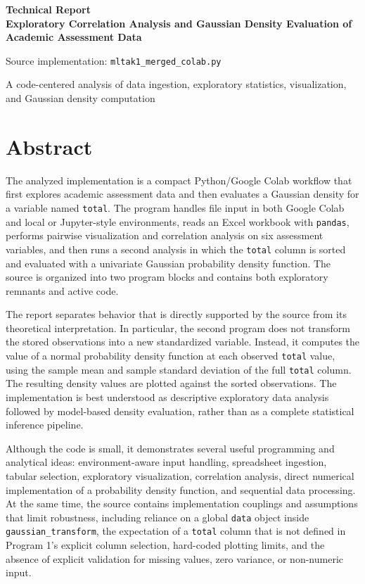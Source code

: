 \documentclass[11pt,a4paper]{article}
\begin{document}
\begin{titlepage}
\centering
\vspace*{2.0cm}
{\LARGE\bfseries Technical Report\\[0.35cm]
Exploratory Correlation Analysis and Gaussian Density Evaluation of Academic Assessment Data\par}
\vspace{1.2cm}
{\large Source implementation: \texttt{mltak1\_merged\_colab.py}\par}
\vfill
{\large A code-centered analysis of data ingestion, exploratory statistics, visualization, and Gaussian density computation\par}
\vspace*{1.5cm}
\end{titlepage}

\tableofcontents
\newpage

\section*{Abstract}
The analyzed implementation is a compact Python/Google Colab workflow that first explores academic assessment data and then evaluates a Gaussian density for a variable named \texttt{total}. The program handles file input in both Google Colab and local or Jupyter-style environments, reads an Excel workbook with \texttt{pandas}, performs pairwise visualization and correlation analysis on six assessment variables, and then runs a second analysis in which the \texttt{total} column is sorted and evaluated with a univariate Gaussian probability density function. The source is organized into two program blocks and contains both exploratory remnants and active code.

The report separates behavior that is directly supported by the source from its theoretical interpretation. In particular, the second program does not transform the stored observations into a new standardized variable. Instead, it computes the value of a normal probability density function at each observed \texttt{total} value, using the sample mean and sample standard deviation of the full \texttt{total} column. The resulting density values are plotted against the sorted observations. The implementation is best understood as descriptive exploratory data analysis followed by model-based density evaluation, rather than as a complete statistical inference pipeline.

Although the code is small, it demonstrates several useful programming and analytical ideas: environment-aware input handling, spreadsheet ingestion, tabular selection, exploratory visualization, correlation analysis, direct numerical implementation of a probability density function, and sequential data processing. At the same time, the source contains implementation couplings and assumptions that limit robustness, including reliance on a global \texttt{data} object inside \texttt{gaussian\_transform}, the expectation of a \texttt{total} column that is not defined in Program 1's explicit column selection, hard-coded plotting limits, and the absence of explicit validation for missing values, zero variance, or non-numeric input.
\end{document}
